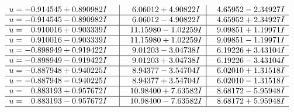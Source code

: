 \documentclass[1p]{elsarticle_modified}
\theoremstyle{definition}
\begin{document}
$$\begin{array}{c|c|c}
\begin{aligned}
u &= -0.914545 + 0.890982 I\end{aligned}
 & \phantom{-}6.06012 + 4.90822 I & \phantom{-}4.65952 - 2.34927 I \\ \hline\begin{aligned}
u &= -0.914545 - 0.890982 I\end{aligned}
 & \phantom{-}6.06012 - 4.90822 I & \phantom{-}4.65952 + 2.34927 I \\ \hline\begin{aligned}
u &= \phantom{-}0.910016 + 0.903339 I\end{aligned}
 & \phantom{-}11.15980 - 1.02259 I & \phantom{-}9.09851 + 1.19971 I \\ \hline\begin{aligned}
u &= \phantom{-}0.910016 - 0.903339 I\end{aligned}
 & \phantom{-}11.15980 + 1.02259 I & \phantom{-}9.09851 - 1.19971 I \\ \hline\begin{aligned}
u &= -0.898949 + 0.919422 I\end{aligned}
 & \phantom{-}9.01203 - 3.04738 I & \phantom{-}6.19226 + 3.43104 I \\ \hline\begin{aligned}
u &= -0.898949 - 0.919422 I\end{aligned}
 & \phantom{-}9.01203 + 3.04738 I & \phantom{-}6.19226 - 3.43104 I \\ \hline\begin{aligned}
u &= -0.887948 + 0.940225 I\end{aligned}
 & \phantom{-}8.94377 - 3.54704 I & \phantom{-}6.02010 + 1.31518 I \\ \hline\begin{aligned}
u &= -0.887948 - 0.940225 I\end{aligned}
 & \phantom{-}8.94377 + 3.54704 I & \phantom{-}6.02010 - 1.31518 I \\ \hline\begin{aligned}
u &= \phantom{-}0.883193 + 0.957672 I\end{aligned}
 & \phantom{-}10.98400 + 7.63582 I & \phantom{-}8.68172 - 5.95948 I \\ \hline\begin{aligned}
u &= \phantom{-}0.883193 - 0.957672 I\end{aligned}
 & \phantom{-}10.98400 - 7.63582 I & \phantom{-}8.68172 + 5.95948 I\\
 \hline 
 \end{array}$$\newpage$$\begin{array}{c|c|c}  

\end{array}$$
\end{document}
